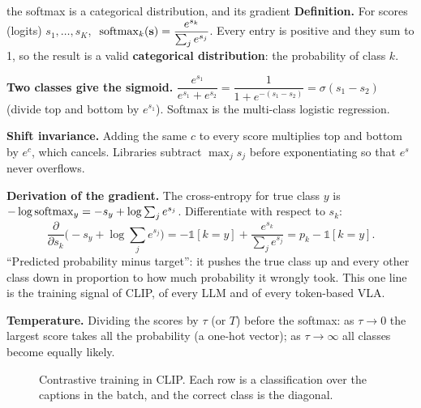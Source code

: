 \begin{probbox}{the softmax is a categorical distribution, and its gradient}
\textbf{Definition.} For scores (logits) $s_1,\dots,s_K$, $\ \operatorname{softmax}_k(\mathbf{s})=\dfrac{e^{s_k}}{\sum_j e^{s_j}}$. Every entry is positive and they sum to 1, so the result is a valid \textbf{categorical distribution}: the probability of class $k$.

\textbf{Two classes give the sigmoid.} $\dfrac{e^{s_1}}{e^{s_1}+e^{s_2}}=\dfrac{1}{1+e^{-(s_1-s_2)}}=\sigma(s_1-s_2)$ (divide top and bottom by $e^{s_1}$). Softmax is the multi-class logistic regression.

\textbf{Shift invariance.} Adding the same $c$ to every score multiplies top and bottom by $e^{c}$, which cancels. Libraries subtract $\max_j s_j$ before exponentiating so that $e^{s}$ never overflows.

\textbf{Derivation of the gradient.} The cross-entropy for true class $y$ is $-\log\operatorname{softmax}_y=-s_y+\log\sum_j e^{s_j}$. Differentiate with respect to $s_k$:
\[
\frac{\partial}{\partial s_k}\Big(-s_y+\log\sum_j e^{s_j}\Big)=-\mathbb 1[k=y]+\frac{e^{s_k}}{\sum_j e^{s_j}}=p_k-\mathbb 1[k=y].
\]
``Predicted probability minus target'': it pushes the true class up and every other class down in proportion to how much probability it wrongly took. This one line is the training signal of CLIP, of every LLM and of every token-based VLA.

\textbf{Temperature.} Dividing the scores by $\tau$ (or $T$) before the softmax: as $\tau\to0$ the largest score takes all the probability (a one-hot vector); as $\tau\to\infty$ all classes become equally likely.
\end{probbox}

\begin{figure}[h]
\centering
{}
\caption{Contrastive training in CLIP. Each row is a classification over the captions in the batch, and the correct class is the diagonal.}
\end{figure}

